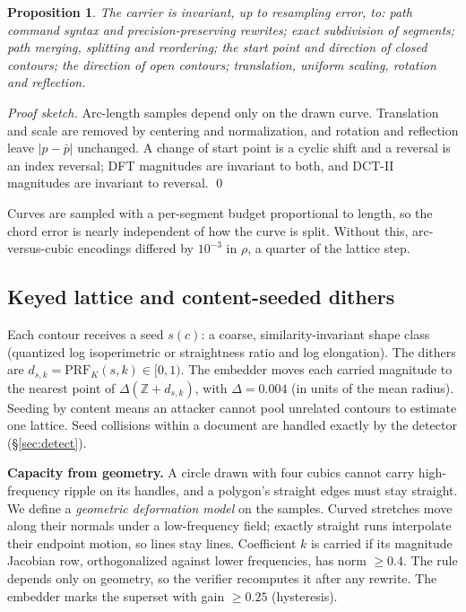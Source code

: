 \documentclass[10pt,twocolumn]{article}
\newtheorem{proposition}{Proposition}
\begin{document}
\begin{proposition}
The carrier is invariant, up to resampling error, to: path command syntax and precision-preserving rewrites; exact subdivision of segments; path merging, splitting and reordering; the start point and direction of closed contours; the direction of open contours; translation, uniform scaling, rotation and reflection.
\end{proposition}
\emph{Proof sketch.} Arc-length samples depend only on the drawn curve. Translation and scale are removed by centering and normalization, and rotation and reflection leave $|p-\bar p|$ unchanged. A change of start point is a cyclic shift and a reversal is an index reversal; DFT magnitudes are invariant to both, and DCT-II magnitudes are invariant to reversal. \qed

Curves are sampled with a per-segment budget proportional to length, so the chord error is nearly independent of how the curve is split. Without this, arc-versus-cubic encodings differed by $10^{-3}$ in $\rho$, a quarter of the lattice step.

\subsection{Keyed lattice and content-seeded dithers}
\label{sec:embed}
Each contour receives a seed $s(c)$: a coarse, similarity-invariant shape class (quantized log isoperimetric or straightness ratio and log elongation). The dithers are $d_{s,k}=\mathrm{PRF}_K(s,k)\in[0,1)$. The embedder moves each carried magnitude to the nearest point of $\Delta(\mathbb Z+d_{s,k})$, with $\Delta=0.004$ (in units of the mean radius). Seeding by content means an attacker cannot pool unrelated contours to estimate one lattice. Seed collisions within a document are handled exactly by the detector (\S\ref{sec:detect}).

\textbf{Capacity from geometry.} A circle drawn with four cubics cannot carry high-frequency ripple on its handles, and a polygon's straight edges must stay straight. We define a \emph{geometric deformation model} on the samples. Curved stretches move along their normals under a low-frequency field; exactly straight runs interpolate their endpoint motion, so lines stay lines. Coefficient $k$ is carried if its magnitude Jacobian row, orthogonalized against lower frequencies, has norm $\ge 0.4$. The rule depends only on geometry, so the verifier recomputes it after any rewrite. The embedder marks the superset with gain $\ge0.25$ (hysteresis).
\end{document}
